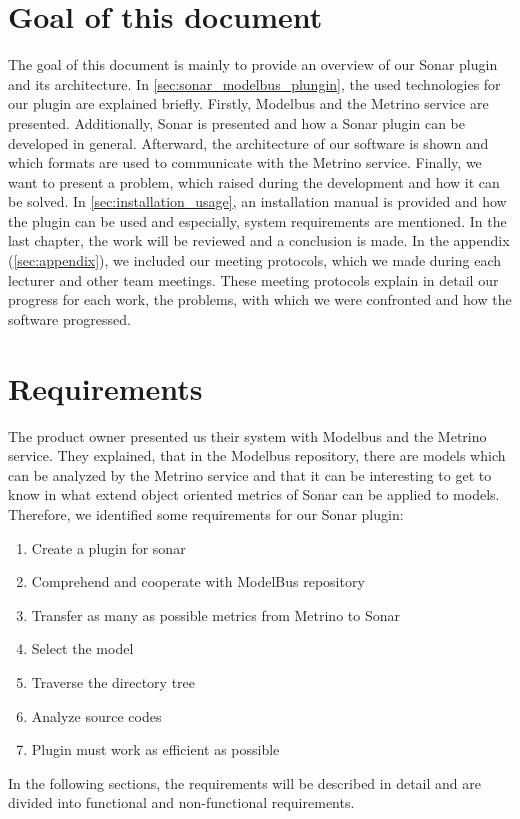 \section{Goal of this document}
The goal of this document is mainly to provide an overview of our Sonar plugin and its architecture. In \autoref{sec:sonar_modelbus_plungin}, the used technologies for our plugin are explained briefly. Firstly, Modelbus and the Metrino service are presented. Additionally, Sonar is presented and how a Sonar plugin can be developed in general. Afterward, the architecture of our software is shown and which formats are used to communicate with the Metrino service. Finally, we want to present a problem, which raised during the development and how it can be solved. In \autoref{sec:installation_usage}, an installation manual is provided and how the plugin can be used and especially, system requirements are mentioned. In the last chapter, the work will be reviewed and a conclusion is made. In the appendix (\autoref{sec:appendix}), we included our meeting protocols, which we made during each lecturer and other team meetings. These meeting protocols explain in detail our progress for each work, the problems, with which we were confronted and how the software progressed.

\section{Requirements}
The product owner presented us their system with Modelbus and the Metrino service. They explained, that in the Modelbus repository, there are models which can be analyzed by the Metrino service and that it can be interesting to get to know in what extend object oriented metrics of Sonar can be applied to models. Therefore, we identified some requirements for our Sonar plugin:
\begin{enumerate}
\item Create a plugin for sonar 
\item Comprehend and cooperate with ModelBus repository
\item Transfer as many as possible metrics from Metrino to Sonar
\item Select the model
\item Traverse the directory tree
\item Analyze source codes
\item Plugin must work as efficient as possible
\end{enumerate}
In the following sections, the requirements will be described in detail and are divided into functional and non-functional requirements.

